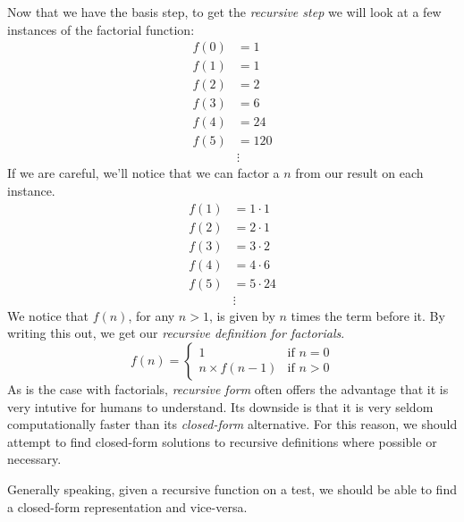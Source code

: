 \begin{ex}
\begin{sol}
    Now that we have the basis step, to get the \emph{recursive step} we will
    look at a few instances of the factorial function:
    \begin{align*}
      f(0) &= 1 \\
      f(1) &= 1 \\
      f(2) &= 2 \\
      f(3) &= 6 \\
      f(4) &= 24 \\
      f(5) &= 120 \\
      & \vdots
    \end{align*}
    If we are careful, we'll notice that we can factor a $n$ from our result on
    each instance.
    \begin{align*}
      f(1) &= 1\cdot1 \\
      f(2) &= 2\cdot1 \\
      f(3) &= 3 \cdot 2 \\
      f(4) &= 4 \cdot 6 \\
      f(5) &= 5 \cdot 24 \\
      &\vdots
    \end{align*}
    We notice that $f(n)$, for any $n > 1$, is given by $n$ times the term
    before it. By writing this out, we get our \emph{recursive definition for
    factorials}.
    \begin{equation}
      f(n) =
      \begin{cases}
        1 & \text{if }n=0 \\
        n \times f(n-1) & \text{if }n > 0
      \end{cases}
    \end{equation}
    As is the case with factorials, \emph{recursive form} often offers the
    advantage that it is very intutive for humans to understand. Its downside is
    that it is very seldom computationally faster than its \emph{closed-form}
    alternative. For this reason, we should attempt to find closed-form
    solutions to recursive definitions where possible or necessary.

    Generally speaking, given a recursive function on a test, we should be able to find a
    closed-form representation and vice-versa.
  \end{sol}
\end{ex}
